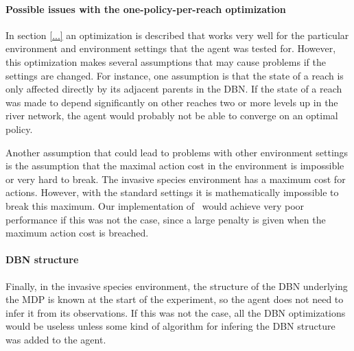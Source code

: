 \paragraph{Possible issues with the one-policy-per-reach optimization} In section \ref{...}  an optimization is described that works very well for the particular environment and environment settings that the agent was tested for. However, this optimization makes several assumptions that may cause problems if the settings are changed. For instance, one assumption is that the state of a reach is only affected directly by its adjacent parents in the DBN. If the state of a reach was made to depend significantly on other reaches two or more levels up in the river network, the agent would probably not be able to converge on an optimal policy. 

Another assumption that could lead to problems with other environment settings is the assumption that the maximal action cost in the environment is impossible or very hard to break. The invasive species environment has a maximum cost for actions. However, with the standard settings it is mathematically impossible to break this maximum. Our implementation of \etre\ would achieve very poor performance if this was not the case, since a large penalty is given when the maximum action cost is breached. 

\paragraph{DBN structure} Finally, in the invasive species environment, the structure of the DBN underlying the MDP is known at the start of the experiment, so the agent does not need to infer it from its observations. If this was not the case, all the DBN optimizations would be useless unless some kind of algorithm for infering the DBN structure was added to the agent. 





%